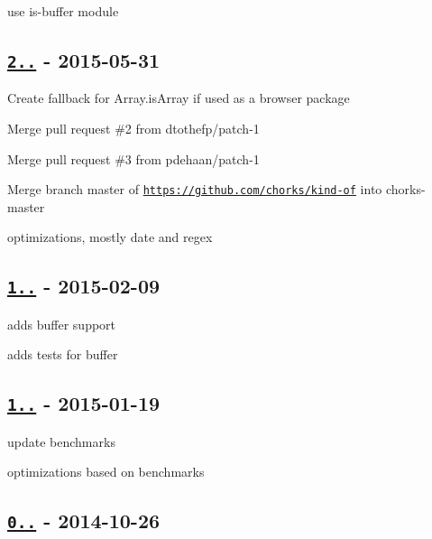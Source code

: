 \begin{DoxyItemize}
\item use {\ttfamily is-\/buffer} module
\end{DoxyItemize}

\subsection*{\href{https://github.com/jonschlinkert/kind-of/compare/1.1.0...2.0.0}{\tt 2..} -\/ 2015-\/05-\/31}


\begin{DoxyItemize}
\item Create fallback for {\ttfamily Array.\+is\+Array} if used as a browser package
\item Merge pull request \#2 from dtothefp/patch-\/1
\item Merge pull request \#3 from pdehaan/patch-\/1
\item Merge branch \textquotesingle{}master\textquotesingle{} of \href{https://github.com/chorks/kind-of}{\tt https\+://github.\+com/chorks/kind-\/of} into chorks-\/master
\item optimizations, mostly date and regex
\end{DoxyItemize}

\subsection*{\href{https://github.com/jonschlinkert/kind-of/compare/1.0.0...1.1.0}{\tt 1..} -\/ 2015-\/02-\/09}


\begin{DoxyItemize}
\item adds {\ttfamily buffer} support
\item adds tests for {\ttfamily buffer}
\end{DoxyItemize}

\subsection*{\href{https://github.com/jonschlinkert/kind-of/compare/0.1.2...1.0.0}{\tt 1..} -\/ 2015-\/01-\/19}


\begin{DoxyItemize}
\item update benchmarks
\item optimizations based on benchmarks
\end{DoxyItemize}

\subsection*{\href{https://github.com/jonschlinkert/kind-of/compare/0.1.0...0.1.2}{\tt 0..} -\/ 2014-\/10-\/26}


